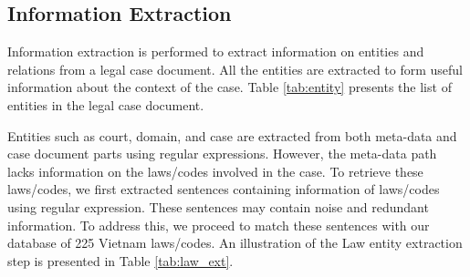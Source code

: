 \documentclass[conference]{IEEEtran}
\begin{document}
\subsection{Information Extraction}
Information extraction is performed to extract information on entities and relations from a legal case document. All the entities are extracted to form useful information about the context of the case. Table \ref{tab:entity} presents the list of entities in the legal case document. 

Entities such as court, domain, and case are extracted from both meta-data and case document parts using regular expressions. However, the meta-data path lacks information on the laws/codes involved in the case. To retrieve these laws/codes, we first extracted sentences containing information of laws/codes using regular expression. These sentences may contain noise and redundant information. To address this, we proceed to match these sentences with our database of 225 Vietnam laws/codes. An illustration of the Law entity extraction step is presented in Table \ref{tab:law_ext}. 
\end{document}
